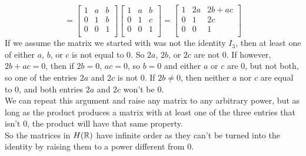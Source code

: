 \documentclass[12pt]{article}
\begin{document}
\begin{enumerate}[label=\textbf{\alph*.}]
\[            = \begin{bmatrix}
                1 & a & b \\
                0 & 1 & b \\
                0 & 0 & 1 \\
            \end{bmatrix}
            \begin{bmatrix}
                1 & a & b \\
                0 & 1 & c \\
                0 & 0 & 1 \\
            \end{bmatrix}
            = \begin{bmatrix}
                1 & 2a & 2b + ac \\
                0 & 1 & 2c \\
                0 & 0 & 1 \\
            \end{bmatrix} \]
            If we assume the matrix we started with was not the identity $I_3$,
            then at least one of either $a$, $b$, or $c$ is not equal to 0.
            So $2a$, $2b$, or $2c$ are not 0.
            If however, $2b + ac = 0$,
            then if $2b = 0$, $ac = 0$,
            so $b = 0$ and either $a$ or $c$ are 0, but not both,
            so one of the entries $2a$ and $2c$ is not 0.
            If $2b \neq 0$, then neither $a$ nor $c$ are equal to 0, and
            both entries $2a$ and $2c$ won't be 0. \\
            We can repeat this argument and raise any matrix to any
            arbitrary power,
            but as long as the product produces a matrix with at least one
            of the three entries that isn't 0, the product will have 
            that same property. \\
            So the matrices in $H(\mathbb{R})$ have infinite order as they can't
            be turned into the identity by raising them to a power different
            from 0. 
    \end{enumerate}
\end{document}
